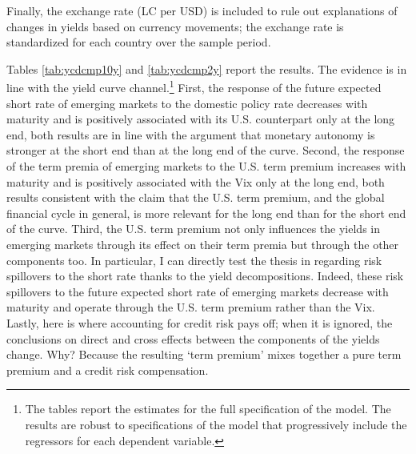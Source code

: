 {%
Finally, the exchange rate (LC per USD) is included to rule out explanations of changes in yields based on currency movements; the exchange rate is standardized for each country over the sample period.

Tables \ref{tab:ycdcmp10y} and \ref{tab:ycdcmp2y} report the results.
The evidence is in line with the yield curve channel.\footnote{ The tables report the estimates for the full specification of the model. The results are robust to specifications of the model that progressively include the regressors for each dependent variable.} 
First, the response of the future expected short rate of emerging markets to the domestic policy rate decreases with maturity and is positively associated with its U.S. counterpart only at the long end, both results are in line with the argument that monetary autonomy is stronger at the short end than at the long end of the curve.
Second, the response of the term premia of emerging markets to the U.S. term premium increases with maturity and is positively associated with the Vix only at the long end, both results consistent with the claim that the U.S. term premium, and the global financial cycle in general, is more relevant for the long end than for the short end of the curve. 
Third, the U.S. term premium not only influences the yields in emerging markets through its effect on their term premia but through the other components too.
In particular, I can directly test the thesis in \cite{Kalemli-Ozcan:2019} regarding risk spillovers to the short rate thanks to the yield decompositions.
Indeed, these risk spillovers to the future expected short rate of emerging markets decrease with maturity and operate through 
the U.S. term premium rather than the Vix.
Lastly, here is where accounting for credit risk pays off; when it is ignored, the conclusions on direct and cross effects between the components of the yields change. Why? Because the resulting `term premium' mixes together a pure term premium and a credit risk compensation.

}
